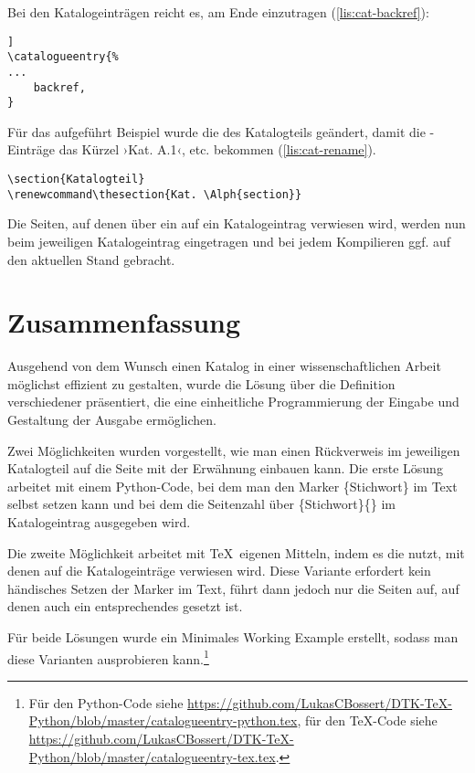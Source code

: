 \documentclass[ngerman]{dtk}
\makeatletter
\newcommand\catalogueentry[1]{%
\RaggedRight\begingroup
\setkeys{catalogue}{#1}%
\ifdef{\KVhouse}{\section{\KVhouse
			\ifdef{\KVlabel}{\label{\KVlabel}}{}}
			}{}%
\begin{labeling}{Beschreibung}
\ifdef{\KVdescription}{\item[Beschreibung] \KVdescription}{}%
\ifdef{\KVlocation}{\item[Verortung] \KVlocation}{}%
\ifdef{\KVinterior}{%
	\item[Ausstattung] \KVinterior %
	\ifboolexpr{bool{@KVinteriorM} or bool {@KVinteriorW} or bool {@KVinteriorS}}{%
	\begin{labeling}{Wandgemälde}
			\ifdef{\KVinteriorM}{\item[Mosaike:] \KVinteriorM}{}
			\ifdef{\KVinteriorW}{\item[Wandgemälde:] \KVinteriorW}{}
			\ifdef{\KVinteriorS}{\item[Statuen:] \KVinteriorS}{}
			\end{labeling}
		}{}}%
	{%
	\ifboolexpr{bool{@KVinteriorM} or bool {@KVinteriorW} or bool {@KVinteriorS}}{%
		\item[Ausstattung]%
	\begin{labeling}{Wandgemälde}	
				\ifdef{\KVinteriorM}{\item[Mosaike:] \KVinteriorM}{}
				\ifdef{\KVinteriorW}{\item[Wandgemälde:] \KVinteriorW}{}
				\ifdef{\KVinteriorS}{\item[Statuen:] \KVinteriorS}{}
			\end{labeling}
	}{}}%
\ifdef{\KVsize}{	\item[Größe] \SI{\KVsize}{\meter\squared}}{}%
\ifdef{\KVbackref}{\item[Erwähnungen]S.\ \KVbackref}{}%
\end{labeling}
\endgroup
}
\makeatother
\begin{document}
Bei den Katalogeinträgen reicht es, am Ende  einzutragen (\cref{lis:cat-backref}):

\begin{lstlisting}[style=number,caption={Ergänzung im Katalogeeintrag},label={lis:cat-backref}]]
\catalogueentry{%
...
	backref,
}
\end{lstlisting}
Für das aufgeführt Beispiel %
wurde die  des Katalogteils geändert, damit die -Einträge das Kürzel ›Kat. A.1‹, etc. bekommen (\cref{lis:cat-rename}).
\begin{lstlisting}[style=number,caption={Modifkation der Namensgebung für Katalogeeinträge},label={lis:cat-rename}]
\section{Katalogteil}
\renewcommand\thesection{Kat. \Alph{section}}
\end{lstlisting}

Die Seiten, auf denen über ein   auf ein Katalogeintrag verwiesen wird,
werden nun beim jeweiligen Katalogeintrag eingetragen und bei jedem Kompilieren ggf. auf den aktuellen Stand gebracht.

\section{Zusammenfassung}
Ausgehend von dem Wunsch einen Katalog in einer wissenschaftlichen Arbeit möglichst effizient zu gestalten, 
wurde die Lösung über die Definition verschiedener   präsentiert,
die eine einheitliche Programmierung der Eingabe und Gestaltung der Ausgabe ermöglichen.

Zwei Möglichkeiten wurden vorgestellt,
wie man einen Rückverweis im jeweiligen Katalogteil auf die Seite mit der Erwähnung einbauen kann.
Die erste Lösung arbeitet mit einem Python-Code, 
bei dem man den Marker \{Stichwort\} im Text selbst setzen kann und bei dem die Seitenzahl über 
\{Stichwort\}\{\} im Katalogeintrag ausgegeben wird.

Die zweite Möglichkeit arbeitet mit \TeX\ eigenen Mitteln,
indem es die  nutzt, mit denen auf die Katalogeinträge verwiesen wird.
Diese Variante erfordert kein händisches Setzen der Marker im Text,
führt dann jedoch nur die Seiten auf, auf denen auch ein entsprechendes   gesetzt ist.

Für beide Lösungen wurde ein Minimales Working Example erstellt,
sodass man diese Varianten ausprobieren kann.\footnote{Für den Python-Code siehe
\url{https://github.com/LukasCBossert/DTK-TeX-Python/blob/master/catalogueentry-python.tex}, für den \TeX -Code siehe  
\url{https://github.com/LukasCBossert/DTK-TeX-Python/blob/master/catalogueentry-tex.tex}.}
\end{document}

